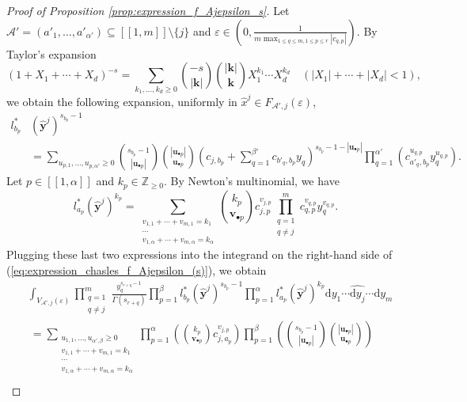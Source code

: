 \documentclass[a4paper]{amsart}
\theoremstyle{remark}
\theoremstyle{definition}
\newcommand{\dd}{\mathrm{d}}
\begin{document}
\begin{proof}[Proof of Proposition \ref{prop:expression_f_Ajepsilon_s}]
Let $\mathcal{A}'=(a'_1,\ldots,a'_{\alpha'}) \subseteq [\![1,m]\!] \setminus \{ j \}$ and $\varepsilon \in (0,\frac{1}{m \max_{1 \leq q \leq m, 1 \leq p \leq r}|c_{q,p}|})$. By Taylor's expansion
$$ (1+X_1+\cdots+X_d)^{-s} = \sum_{k_1,\ldots,k_d \geq 0} \binom{-s}{|\mathbf{k}|} \binom{|\mathbf{k}|}{\mathbf{k}} X_1^{k_1} \cdots X_{d}^{k_d} \quad (|X_1|+\cdots+|X_d|<1), $$
we obtain the following expansion, uniformly in $\widehat{x}^j \in F_{\mathcal{A}',j}(\varepsilon)$,
\begin{align*}
    l^*_{b_p}&(\widehat{\mathbf{y}}^j)^{s_{b_p}-1} \\
    &= \sum_{u_{p,1}, \ldots, u_{p,\alpha'} \geq 0} \binom{s_{b_p}-1}{|\mathbf{u}_{\bullet p}|} \binom{|\mathbf{u}_{\bullet p}|}{\mathbf{u}_{\bullet p}} \left( c_{j,b_p}+\sum_{q=1}^{\beta'} c_{b'_q,b_p} y_q \right)^{s_{b_p}-1-|\mathbf{u}_{\bullet p}|} \prod_{q=1}^{\alpha'} \left(c_{a'_q,b_p}^{u_{q,p}} y_{q}^{u_{q,p}}\right).
\end{align*}
Let $p \in [\![ 1, \alpha ]\!]$ and $k_p \in \mathbb{Z}_{\geq 0}$. By Newton's multinomial, we have
$$ l^*_{a_p}(\widehat{\mathbf{y}}^j)^{k_p} = \sum_{\substack{v_{1,1}+\cdots+v_{m,1}=k_1 \\ \cdots \\ v_{1,\alpha}+\cdots+v_{m,\alpha}=k_{\alpha}}}  \binom{k_p}{\mathbf{v}_{\bullet p}} c_{j,p}^{v_{j,p}} \prod_{\substack{q=1 \\ q \neq j}}^m c_{q,p}^{v_{q,p}} y_{q}^{v_{q,p}}. $$
Plugging these last two expressions into the integrand on the right-hand side of (\ref{eq:expression_chasles_f_Ajepsilon_(s)}), we obtain
\begin{align}
    &\int_{V_{\mathcal{A}',j}(\varepsilon)} \prod_{\substack{q=1 \\ q \neq j}}^{m} \frac{y_q^{s_{r+q}-1}}{\Gamma(s_{r+q})} \prod_{p=1}^{\beta} l^*_{b_p}(\widehat{\mathbf{y}}^j)^{s_{b_p}-1} \prod_{p=1}^{\alpha} l^*_{a_p}(\widehat{\mathbf{y}}^j)^{k_p} \dd y_1 \cdots \widehat{\dd y_{j}} \cdots \dd y_{m} \nonumber \\
    & \ = \sum_{\substack{ u_{1,1},\ldots,u_{\alpha',\beta} \geq 0 \\ v_{1,1}+\cdots+v_{m,1}=k_1 \\ \cdots \\ v_{1,\alpha}+\cdots+v_{m,\alpha}=k_{\alpha}}} \prod_{p=1}^{\alpha} \left( \binom{k_p}{\mathbf{v}_{\bullet p}} c_{j,a_p}^{v_{j,p}} \right) \prod_{p=1}^{\beta} \left( \binom{s_{b_p}-1}{|\mathbf{u}_{\bullet p}|} \binom{|\mathbf{u}_{\bullet p}|}{\mathbf{u}_{\bullet p}} \right) \label{eq:taylor_series_injection_f_AJepsilon_s} \\

\end{align}
\end{proof}
\end{document}
